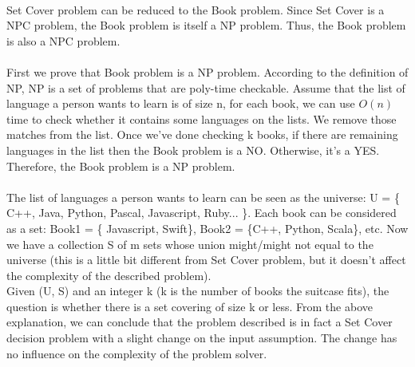 \begin{problem}{4} ~\\
Set Cover problem can be reduced to the Book problem. Since Set Cover is a NPC problem, the Book problem is itself a NP problem. Thus, the Book problem is also a NPC problem.\\
\\
First we prove that Book problem is a NP problem. According to the definition of NP, NP is a set of problems that are poly-time checkable. Assume that the list of language a person wants to learn is of size n, for each book, we can use $O(n)$ time to check whether it contains some languages on the lists. We remove those matches from the list. Once we've done checking k books, if there are remaining languages in the list then the Book problem is a NO. Otherwise, it's a YES. Therefore, the Book problem is a NP problem.\\
\\
The list of languages a person wants to learn can be seen as the universe: U = \{ C++, Java, Python, Pascal, Javascript, Ruby... \}. Each book can be considered as a set: Book1 = \{ Javascript, Swift\}, Book2 = \{C++, Python, Scala\}, etc. Now we have a collection S of m sets whose union might/might not equal to the universe (this is a little bit different from Set Cover problem, but it doesn't affect the complexity of the described problem).\\ 

Given (U, S) and an integer k (k is the number of books the suitcase fits), the question is whether there is a set covering of size k or less. From the above explanation, we can conclude that the problem described is in fact a Set Cover decision problem with a slight change on the input assumption. The change has no influence on the complexity of the problem solver.

\end{problem}